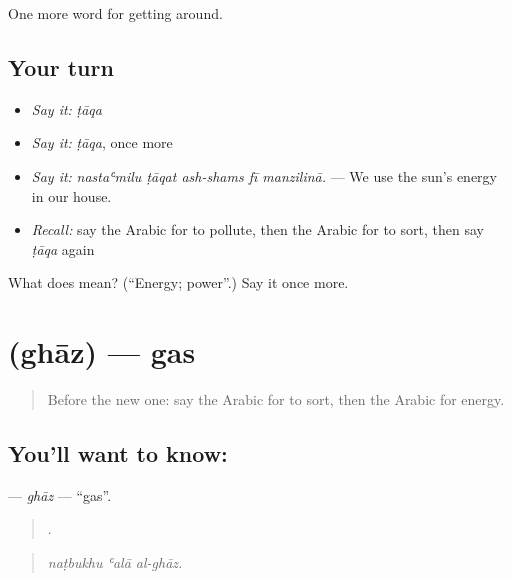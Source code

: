 \begin{grammarlens}[title={What you've built}]
One more word for getting around.
\end{grammarlens}

\subsection*{Your turn}
\begin{itemize}
\raggedright
  \item \emph{Say it:} \emph{ṭāqa}
  \item \emph{Say it:} \emph{ṭāqa}, once more
  \item \emph{Say it:} \emph{nastaʿmilu ṭāqat ash-shams fī manzilinā.} — We use the sun's energy in our house.
  \item \emph{Recall:} say the Arabic for to pollute, then the Arabic for to sort, then say \emph{ṭāqa} again
\end{itemize}

\begin{tcolorbox}[breakable,colback=teal!4,colframe=teal!35!black,title={Before you move on}]
What does  mean? (\textquotedblleft{}Energy; power\textquotedblright{}.) Say it once more.
\end{tcolorbox}
\section[\texorpdfstring{\ar{غاز} (ghāz)}{غاز (ghāz)}]{ (ghāz) — gas}

\label{lesson:AR-C465-ghaz}



\begin{quote}
Before the new one: say the Arabic for to sort, then the Arabic for energy.
\end{quote}

\subsection*{You'll want to know: }
\textbf{} — \emph{ghāz} — \textquotedblleft{}gas\textquotedblright{}.

\begin{quote}
  .
\end{quote}

\begin{quote}
\emph{naṭbukhu ʿalā al-ghāz.}
\end{quote}

